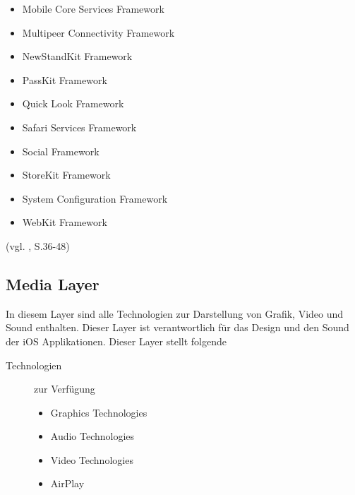 \begin{description}
\begin{multicols}{2}
\begin{itemize}
		\item Mobile Core Services Framework
		\item Multipeer Connectivity Framework
		\item NewStandKit Framework
		\item PassKit Framework
		\item Quick Look Framework
		\item Safari Services Framework
		\item Social Framework
		\item StoreKit Framework
		\item System Configuration Framework
		\item WebKit Framework
	\end{itemize}
	\end{multicols}
\end{description}
(vgl. \cite{Apple[6]}, S.36-48)
\subsection{Media Layer}
\label{sec:MediaLayer}		
In diesem Layer sind alle Technologien zur Darstellung von Grafik, Video und
Sound enthalten. Dieser Layer ist verantwortlich für das Design und den Sound
der iOS Applikationen.
Dieser Layer stellt folgende
\begin{description}
	\item[\glqq Technologien\grqq{}]zur Verfügung~\par
	\begin{itemize}
		\item Graphics Technologies
		\item Audio Technologies
		\item Video Technologies
		\item AirPlay
	\end{itemize}
\end{description}

